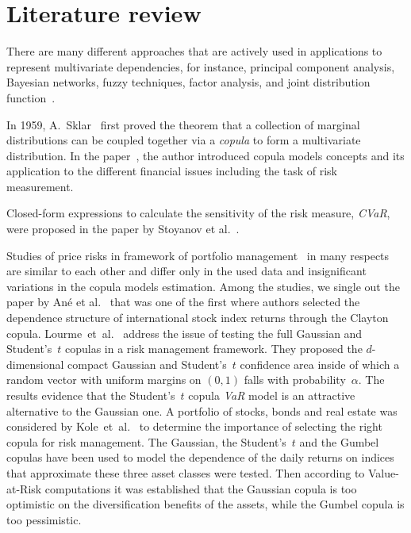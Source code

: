 \section*{Literature review}

There are many different approaches that are actively used in applications to represent multivariate dependencies, for instance, principal component analysis, Bayesian networks, fuzzy techniques, factor analysis, and joint distribution function~\cite{Huynh2014, Kole2007}. 

In 1959, A.~Sklar~\cite{Sklar1959} first proved the theorem that a collection of marginal distributions can be coupled together via a \textit{copula} to form a multivariate distribution.
In the paper~\cite{Penikas2010}, the author introduced copula models concepts and its application to the different financial issues including the task of risk measurement.

Closed-form expressions to calculate the sensitivity of the risk measure, \textit{CVaR}, were proposed in the paper by Stoyanov et al.~\cite{Stoyanov2013}.

Studies of price risks in framework of portfolio management~\cite{Ane2003, Kole2007, Lourme2016, Xu2008} in many respects are similar to each other and differ only in the used data and insignificant variations in the copula models estimation. 
Among the studies, we single out the paper by An\'e et al.~\cite{Ane2003} that was one of the first where authors selected the dependence structure of international stock index returns through the Clayton copula. 
Lourme~et~al.~\cite{Lourme2016} address the issue of testing the full Gaussian and Student's~$t$ copulas in a risk management framework.
They proposed the $d$-dimensional compact Gaussian and Student's~$t$ confidence area inside of which a random vector with uniform margins on $(0, 1)$ falls with probability~$\alpha$. 
The results evidence that the Student's~$t$ copula \textit{VaR} model is an attractive alternative to the Gaussian one.
A portfolio of stocks, bonds and real estate was considered by Kole~et~al.~\cite{Kole2007} to determine the importance of selecting the right copula for risk management. 
The Gaussian, the Student’s~$t$ and the Gumbel copulas have been used to model the dependence of the daily returns on indices that approximate these three asset classes were tested. 
Then according to Value-at-Risk computations it was established that the Gaussian copula is too optimistic on the diversification benefits of the assets, while the Gumbel copula is too pessimistic.

